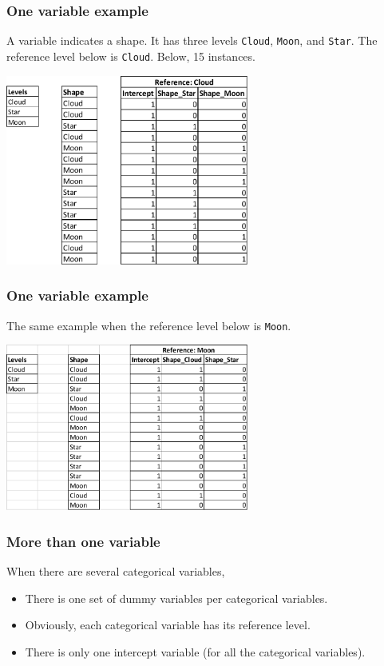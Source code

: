 \begin{frame}
\frametitle{One variable example}
A variable indicates a shape. It has three levels {\tt Cloud}, {\tt Moon}, and {\tt Star}. The reference level below is {\tt Cloud}. Below, 15 instances. 
\begin{center}
\includegraphics[width=8cm]{../Graphs/Dummy_1.png}  
\end{center}
\end{frame}
\begin{frame}
\frametitle{One variable example}
The same example when the reference level below is {\tt Moon}. 
\begin{center}
\includegraphics[width=8cm]{../Graphs/Dummy_2.png}  
\end{center}
\end{frame}
\begin{frame}
\frametitle{More than one variable}
When there are several categorical variables,
\begin{itemize}
\item There is one set of dummy variables per categorical variables.
\item Obviously, each categorical variable has its reference level.
\item There is only one intercept variable (for all the categorical variables).
\end{itemize}
\end{frame}
